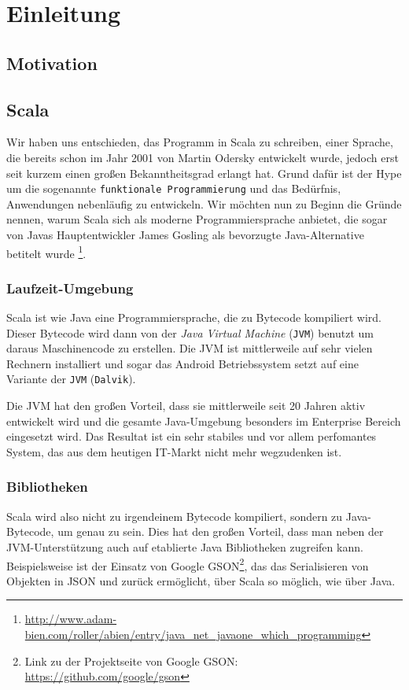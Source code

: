 \chapter{Einleitung}\label{chap:intro}
\section{Motivation}

\section{Scala}
Wir haben uns entschieden, das Programm in Scala zu schreiben, einer Sprache, die bereits schon im Jahr 2001 von Martin Odersky entwickelt wurde, jedoch erst seit kurzem einen großen Bekanntheitsgrad erlangt hat. Grund dafür ist der Hype um die sogenannte \texttt{funktionale Programmierung} und das Bedürfnis, Anwendungen nebenläufig zu entwickeln.
Wir möchten nun zu Beginn die Gründe nennen, warum Scala sich als moderne Programmiersprache anbietet, die sogar von Javas Hauptentwickler James Gosling als bevorzugte Java-Alternative betitelt wurde \footnote{\url{http://www.adam-bien.com/roller/abien/entry/java_net_javaone_which_programming}}.

\subsection{Laufzeit-Umgebung}
Scala ist wie Java eine Programmiersprache, die zu Bytecode kompiliert wird. Dieser Bytecode wird dann von der \textit{Java Virtual Machine} (\texttt{JVM}) benutzt um daraus Maschinencode zu erstellen. Die JVM ist mittlerweile auf sehr vielen Rechnern installiert und sogar das Android Betriebssystem setzt auf eine Variante der \texttt{JVM} (\texttt{Dalvik}).

Die JVM hat den großen Vorteil, dass sie mittlerweile seit 20 Jahren aktiv entwickelt wird und die gesamte Java-Umgebung besonders im Enterprise Bereich eingesetzt wird. Das Resultat ist ein sehr stabiles und vor allem perfomantes System, das aus dem heutigen IT-Markt nicht mehr wegzudenken ist.

\subsection{Bibliotheken}
Scala wird also nicht zu irgendeinem Bytecode kompiliert, sondern zu Java-Bytecode, um genau zu sein. Dies hat den großen Vorteil, dass man neben der JVM-Unterstützung auch auf etablierte Java Bibliotheken zugreifen kann. Beispielsweise ist der Einsatz von Google GSON\footnote{Link zu der Projektseite von Google GSON: \url{https://github.com/google/gson}}, das das Serialisieren von Objekten in JSON und zurück ermöglicht, über Scala so möglich, wie über Java.

